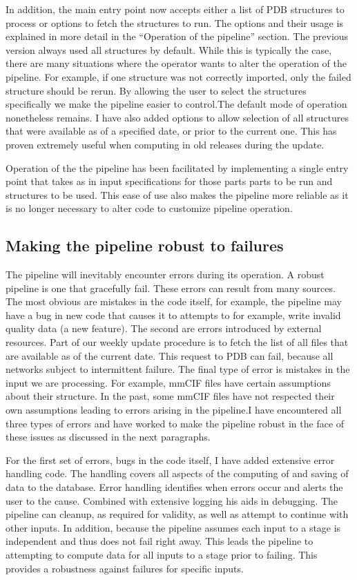 In addition, the main entry point now accepts either a list of PDB structures to
process or options to fetch the structures to run. The options and their usage
is explained in more detail in the ``Operation of the pipeline'' section. The
previous version always used all structures by default. While this is typically
the case, there are many situations where the operator wants to alter the
operation of the pipeline. For example, if one structure was not correctly
imported, only the failed structure should be rerun. By allowing the user to
select the structures specifically we make the pipeline easier to control.The
default mode of operation nonetheless remains. I have also added options to
allow selection of all structures that were available as of a specified date, or
prior to the current one. This has proven extremely useful when computing in old
releases during the update.

Operation of the the pipeline has been facilitated by implementing a single
entry point that takes as in input specifications for those parts parts to be
run and structures to be used. This ease of use also makes the pipeline more
reliable as it is no longer necessary to alter code to customize pipeline
operation.

\subsection{Making the pipeline robust to failures}

The pipeline will inevitably encounter errors during its operation. A robust
pipeline is one that gracefully fail. These errors can result from many sources.
The most obvious are mistakes in the code itself, for example, the pipeline may
have a bug in new code that causes it to attempts to for example, write invalid
quality data (a new feature). The second are errors introduced by external
resources. Part of our weekly update procedure is to fetch the list of all files
that are available as of the current date. This request to PDB can fail, because
all networks subject to intermittent failure. The final type of error is
mistakes in the input we are processing. For example, mmCIF files have certain
assumptions about their structure. In the past, some mmCIF files have not
respected their own assumptions leading to errors arising in the pipeline.I have
encountered all three types of errors and have worked to make the pipeline
robust in the face of these issues as discussed in the next paragraphs.

For the first set of errors, bugs in the code itself, I have added extensive
error handling code. The handling covers all aspects of the computing of and
saving of data to the database. Error handling identifies when errors occur and
alerts the user to the cause. Combined with extensive logging his aids in
debugging. The pipeline can cleanup, as required for validity, as well as
attempt to continue with other inputs. In addition, because the pipeline assumes
each input to a stage is independent and thus does not fail right away. This
leads the pipeline to attempting to compute data for all inputs to a stage prior
to failing. This provides a robustness against failures for specific inputs.

